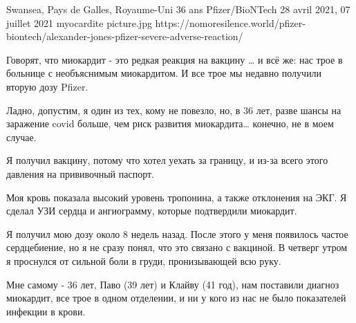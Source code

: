           {Swansea, Pays de Galles, Royaume-Uni}
          {36 ans}
          {Pfizer/BioNTech}
          {28 avril 2021, 07 juillet 2021}
          {myocardite}
          {picture.jpg}
          {https://nomoresilence.world/pfizer-biontech/alexander-jones-pfizer-severe-adverse-reaction/}
          {

Говорят, что миокардит - это редкая реакция на вакцину … и всё же: нас трое в больнице с необъяснимым миокардитом. И все трое мы недавно получили вторую дозу Pfizer.

Ладно, допустим, я один из тех, кому не повезло, но, в 36 лет, разве шансы на заражение covid больше, чем риск развития миокардита… конечно, не в моем случае.

Я получил вакцину, потому что хотел уехать за границу, и из-за всего этого давления на прививочный паспорт.

Моя кровь показала высокий уровень тропонина, а также отклонения на ЭКГ. Я сделал УЗИ сердца и ангиограмму, которые подтвердили миокардит.

Я получил мою дозу около 8 недель назад. После этого у меня появилось частое сердцебиение, но я не сразу понял, что это связано с вакциной. В четверг утром я проснулся от сильной боли в груди, пронизывающей всю руку.

Мне самому - 36 лет, Паво (39 лет) и Клайву (41 год), нам поставили диагноз миокардит, все трое в одном отделении, и ни у кого из нас не было показателей инфекции в крови.
}

